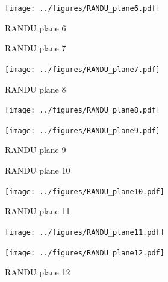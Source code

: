 \documentclass{article}
\begin{document}
\begin{enumerate}
\begin{enumerate}
\begin{figure}[H]
\begin{minipage}{.3\textwidth}
                        \caption{RANDU plane 6}
                        \texttt{[image: ../figures/RANDU\_plane6.pdf]}
                    \end{minipage}
                \end{figure}
                \begin{figure}[H]
                    \centering
                    \begin{minipage}{.3\textwidth}
                        \centering
                        \caption{RANDU plane 7}
                        \texttt{[image: ../figures/RANDU\_plane7.pdf]}
                    \end{minipage}
                    \begin{minipage}{.3\textwidth}
                        \centering
                        \caption{RANDU plane 8}
                        \texttt{[image: ../figures/RANDU\_plane8.pdf]}
                    \end{minipage}
                    \begin{minipage}{.3\textwidth}
                        \centering
                        \caption{RANDU plane 9}
                        \texttt{[image: ../figures/RANDU\_plane9.pdf]}
                    \end{minipage}
                \end{figure}
                \begin{figure}[H]
                    \centering
                    \begin{minipage}{.3\textwidth}
                        \centering
                        \caption{RANDU plane 10}
                        \texttt{[image: ../figures/RANDU\_plane10.pdf]}
                    \end{minipage}
                    \begin{minipage}{.3\textwidth}
                        \centering
                        \caption{RANDU plane 11}
                        \texttt{[image: ../figures/RANDU\_plane11.pdf]}
                    \end{minipage}
                    \begin{minipage}{.3\textwidth}
                        \centering
                        \caption{RANDU plane 12}
                        \texttt{[image: ../figures/RANDU\_plane12.pdf]}
                    \end{minipage}
                \end{figure}
                \begin{figure}[H]

\end{figure}
\end{enumerate}
\end{enumerate}
\end{document}
